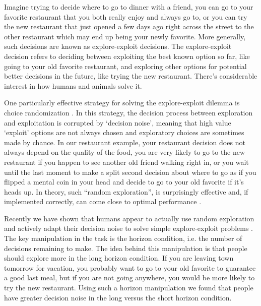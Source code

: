 \documentclass[12pt]{article}
\begin{document}
	Imagine trying to decide where to go to dinner with a friend, you can go to your favorite restaurant that you both really enjoy and always go to, or you can try the new restaurant that just opened a few days ago right across the street to the other restaurant which may end up being your newly favorite. More generally, such decisions are known as explore-exploit decisions. The explore-exploit decision refers to deciding between exploiting the best known option so far, like going to your old favorite restaurant, and exploring other options for potential better decisions in the future, like trying the new restaurant. There's considerable interest in how humans and animals solve it.\citep{eegittins74, eeauer02,eegittins79,eekrebs78,eethompson33, eewatkins89, eebridle90,eemeyer95, eebanks97,eefrank09, eesteyvers09, eelee11, eepl12,eezhang13,eedaw06, eepl11, wilson2014}
	
	One particularly effective strategy for solving the explore-exploit dilemma is choice randomization \citep{eethompson33, eewatkins89, eebridle90}. In this strategy, the decision process between exploration and exploitation is corrupted by `decision noise', meaning that high value `exploit' options are not always chosen and exploratory choices are sometimes made by chance. In our restaurant example, your restaurant decision does not always depend on the quality of the food, you are very likely to go to the new restaurant if you happen to see another old friend walking right in, or you wait until the last moment to make a split second decision about where to go as if you flipped a mental coin in your head and decide to go to your old favorite if it's heads up. In theory, such “random exploration”, is surprisingly effective and, if implemented correctly, can come close to optimal performance \citep{eebridle90}. 
	
	Recently we have shown that humans appear to actually use random exploration and actively adapt their decision noise to solve simple explore-exploit problems \citep{wilson2014}.  The key manipulation in the task is the horizon condition, i.e. the number of decisions remaining to make. The idea behind this manipulation is that people should explore more in the long horizon condition. If you are leaving town tomorrow for vacation, you probably want to go to your old favorite to guarantee a good last meal, but if you are not going anywhere, you would be more likely to try the new restaurant. Using such a horizon manipulation we found that people have greater decision noise in the long versus the short horizon condition. 
	
\end{document}
